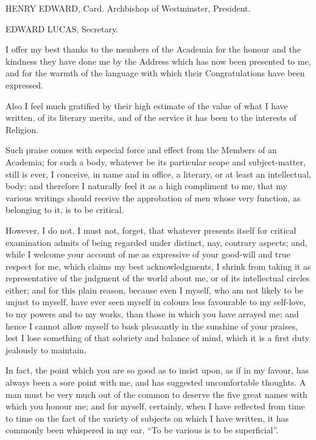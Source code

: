 HENRY EDWARD, Card.
Archbishop of Westminster, President.

EDWARD LUCAS, Secretary.


I offer my best thanks to the members of the Academia for the
honour and the kindness they have done me by the Address which has now
been presented to me, and for the warmth of the language with
which their Congratulations have been expressed.

Also I feel much gratified by their high estimate of the value of
what I have written, of its literary merits, and of the service it has
been to the interests of Religion.

Such praise comes with especial force and effect from the Members
of an Academia; for such a body, whatever be its particular scope and
subject-matter, still is ever, I conceive, in name and in office, a
literary, or at least an intellectual, body; and therefore I naturally
feel it as a high compliment to me, that my various writings should
receive the approbation of men whose very function, as belonging to
it, is to be critical.

However, I do not, I must not, forget, that whatever presents
itself for critical examination admits of being regarded under
distinct, nay, contrary aspects; and, while I welcome your account of
me as expressive of your good-will and true respect for me, which
claims my best acknowledgments, I shrink from taking it as
representative of the judgment of the world about me, or of its
intellectual circles either; and for this plain reason, because
even I myself, who am not likely to be unjust to myself, have ever
seen myself in colours less favourable to my self-love, to my powers
and to my works, than those in which you have arrayed me; and hence I
cannot allow myself to bask pleasantly in the sunshine of your
praises, lest I lose something of that sobriety and balance of mind,
which it is a first duty jealously to maintain.

In fact, the point which you are so good as to insist upon, as if
in my favour, has always been a sore point with me, and has suggested
uncomfortable thoughts. A man must be very much out of the common to
deserve the five great names with which you honour me; and for myself,
certainly, when I have reflected from time to time on the fact of the
variety of subjects on which I have written, it has commonly been
whispered in my ear, ``To be various is to be superficial''.

